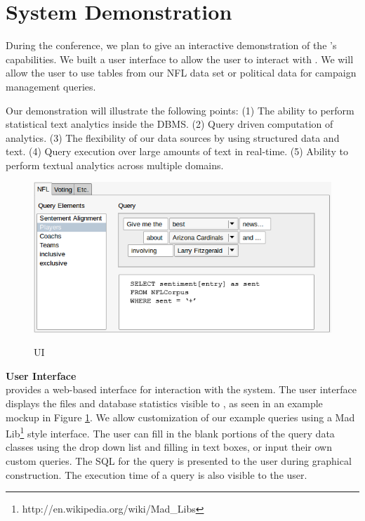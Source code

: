 
\section{System Demonstration}

During the conference, we plan to give an interactive demonstration of the 
{\system}'s capabilities.
We built a user interface to allow the user to interact with \system. 
We will allow the user to use tables from our NFL data set or political data
for campaign management queries.

Our demonstration will illustrate the following points: 
(1) The ability to perform statistical text analytics inside the DBMS.
(2) Query driven computation of analytics.
(3) The flexibility of our data sources by using structured data and text.
(4) Query execution over large amounts of text in real-time.
(5) Ability to perform textual analytics across multiple domains. \\

\begin{figure}
    \begin{center}
	   \includegraphics[scale=.35]{content/graphics/ui1.png}
	   \label{fig:ui1}
	   \caption{\system UI} 
	\end{center}
\end{figure} 

\noindent
\textbf{User Interface}\\
\system provides a web-based interface for interaction with the system.
The user interface displays the files and database statistics visible to
\system, as seen in an example mockup in Figure \ref{fig:ui1}. 
We allow customization of our example queries using a 
Mad Lib\footnote{http://en.wikipedia.org/wiki/Mad\_Libs} style interface.
The user can fill in the blank portions of the query data classes using the 
drop down list and filling in text boxes, or input their own custom queries.
The SQL for the query is presented to the user during graphical construction.
The execution time of a query is also visible to the user.\\

